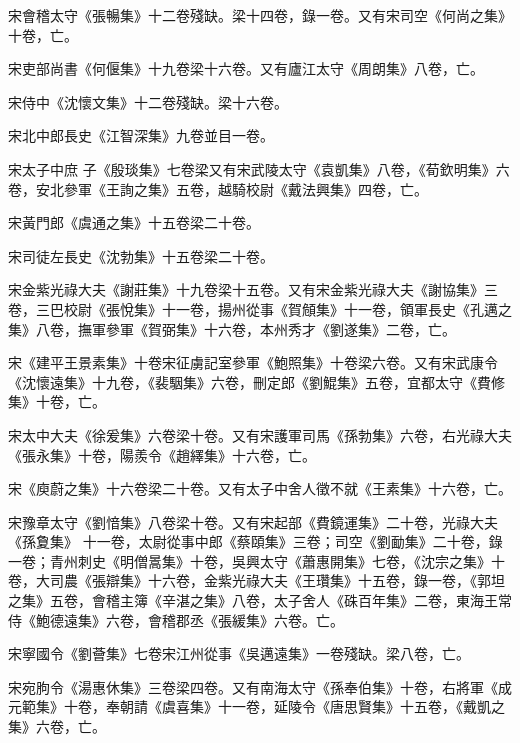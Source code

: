 \begin{pinyinscope}
 宋會稽太守《張暢集》十二卷殘缺。梁十四卷，錄一卷。又有宋司空《何尚之集》十卷，亡。



 宋吏部尚書《何偃集》十九卷梁十六卷。又有廬江太守《周朗集》八卷，亡。



 宋侍中《沈懷文集》十二卷殘缺。梁十六卷。



 宋北中郎長史《江智深集》九卷並目一卷。



 宋太子中庶
 子《殷琰集》七卷梁又有宋武陵太守《袁凱集》八卷，《荀欽明集》六卷，安北參軍《王詢之集》五卷，越騎校尉《戴法興集》四卷，亡。



 宋黃門郎《虞通之集》十五卷梁二十卷。



 宋司徒左長史《沈勃集》十五卷梁二十卷。



 宋金紫光祿大夫《謝莊集》十九卷梁十五卷。又有宋金紫光祿大夫《謝協集》三卷，三巴校尉《張悅集》十一卷，揚州從事《賀頠集》十一卷，領軍長史《孔邁之集》八卷，撫軍參軍《賀弼集》十六卷，本州秀才《劉遂集》二卷，亡。



 宋《建平王景素集》十卷宋征虜記室參軍《鮑照集》十卷梁六卷。又有宋武康令《沈懷遠集》十九卷，《裴駰集》六卷，刪定郎《劉鯤集》五卷，宜都太守《費修集》十卷，亡。



 宋太中大夫《徐爰集》六卷梁十卷。又有宋護軍司馬《孫勃集》六卷，右光祿大夫《張永集》十卷，陽羨令《趙繹集》十六卷，亡。



 宋《庾蔚之集》十六卷梁二十卷。又有太子中舍人徵不就《王素集》十六卷，亡。



 宋豫章太守《劉愔集》八卷梁十卷。又有宋起部《費鏡運集》二十卷，光祿大夫《孫夐集》
 十一卷，太尉從事中郎《蔡頤集》三卷；司空《劉勔集》二十卷，錄一卷；青州刺史《明僧暠集》十卷，吳興太守《蕭惠開集》七卷，《沈宗之集》十卷，大司農《張辯集》十六卷，金紫光祿大夫《王瓚集》十五卷，錄一卷，《郭坦之集》五卷，會稽主簿《辛湛之集》八卷，太子舍人《硃百年集》二卷，東海王常侍《鮑德遠集》六卷，會稽郡丞《張緩集》六卷。亡。



 宋寧國令《劉薈集》七卷宋江州從事《吳邁遠集》一卷殘缺。梁八卷，亡。



 宋宛朐令《湯惠休集》三卷梁四卷。又有南海太守《孫奉伯集》十卷，右將軍《成元範集》十卷，奉朝請《虞喜集》十一卷，延陵令《唐思賢集》十五卷，《戴凱之集》六卷，亡。




\end{pinyinscope}
